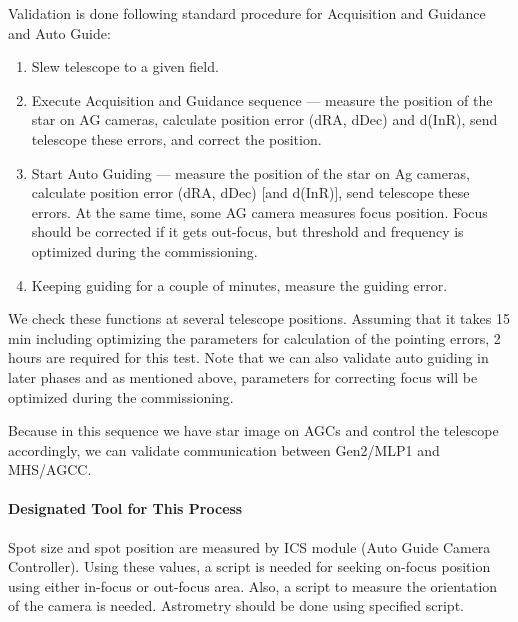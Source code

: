 Validation is done following standard procedure for Acquisition and Guidance and Auto Guide:
\begin{enumerate}
\item Slew telescope to a given field.
\item Execute Acquisition and Guidance sequence --- measure the position of the star on AG cameras, calculate position error (dRA, dDec) and d(InR), send telescope these errors, and correct the position.
\item Start Auto Guiding --- measure the position of the star on Ag cameras, calculate position error (dRA, dDec) [and d(InR)], send telescope these errors.
At the same time, some AG camera measures focus position.
Focus should be corrected if it gets out-focus, but threshold and frequency is optimized during the commissioning.
\item Keeping guiding for a couple of minutes, measure the guiding error.
\end{enumerate}


We check these functions at several telescope positions.
Assuming that it takes 15 min including optimizing the parameters for calculation of the pointing errors, 2 hours are required for this test.
Note that we can also validate auto guiding in later phases and as mentioned above, parameters for correcting focus will be optimized during the commissioning.

\smallskip

Because in this sequence we have star image on AGCs  and control the telescope accordingly, we can validate communication between Gen2/MLP1 and MHS/AGCC.

\paragraph{Designated Tool for This Process}
Spot size and spot position are measured by ICS module (Auto Guide Camera Controller).
Using these values, a script is needed for seeking on-focus position using either in-focus or out-focus area.
Also, a script to measure the orientation of the camera is needed.
Astrometry should be done using specified script.

